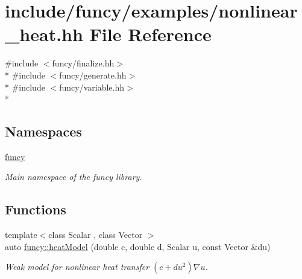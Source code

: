 \hypertarget{nonlinear__heat_8hh}{\section{include/funcy/examples/nonlinear\-\_\-heat.hh File Reference}
\label{nonlinear__heat_8hh}
}
{\ttfamily \#include $<$funcy/finalize.\-hh$>$}\\*
{\ttfamily \#include $<$funcy/generate.\-hh$>$}\\*
{\ttfamily \#include $<$funcy/variable.\-hh$>$}\\*
\subsection*{Namespaces}
\begin{DoxyCompactItemize}
\item 
\hyperlink{namespacefuncy}{funcy}
\begin{DoxyCompactList}\small\item\em Main namespace of the funcy library. \end{DoxyCompactList}\end{DoxyCompactItemize}
\subsection*{Functions}
\begin{DoxyCompactItemize}
\item 
{\footnotesize template$<$class Scalar , class Vector $>$ }\\auto \hyperlink{namespacefuncy_aa784fe45579db52a36805656559a7afe}{funcy\-::heat\-Model} (double c, double d, Scalar u, const Vector \&du)
\begin{DoxyCompactList}\small\item\em Weak model for nonlinear heat transfer $ (c+du^2)\nabla u $. \end{DoxyCompactList}\end{DoxyCompactItemize}
